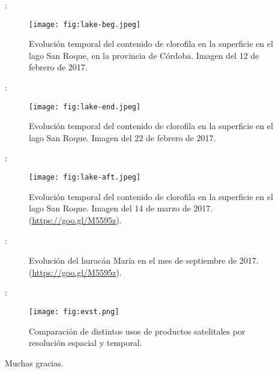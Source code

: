 \begin{frame}{\secname : \subsecname}
    \begin{figure}[h!]
        \centering
        \texttt{[image: fig:lake-beg.jpeg]}
        \caption{Evolución temporal del contenido de clorofila en la superficie en el lago San Roque, en la provincia de Córdoba. Imagen del 12 de febrero de 2017.}
        \label{fig:lake-beg}
    \end{figure}
\end{frame}

\begin{frame}{\secname : \subsecname}
    \begin{figure}[h!]
        \centering
        \texttt{[image: fig:lake-end.jpeg]}
        \caption{Evolución temporal del contenido de clorofila en la superficie en el lago San Roque. Imagen del 22 de febrero de 2017.}
        \label{fig:lake-end}
    \end{figure}
\end{frame}

\begin{frame}{\secname : \subsecname}
    \begin{figure}[h!]
        \centering
        \texttt{[image: fig:lake-aft.jpeg]}
        \caption{Evolución temporal del contenido de clorofila en la superficie en el lago San Roque. Imagen del 14 de marzo de 2017. (\href{https://goo.gl/M5595z}{https://goo.gl/M5595z}).}
        \label{fig:lake-aft}
    \end{figure}
\end{frame}

\begin{frame}{\secname : \subsecname}
    \begin{figure}[h!]
    \centering
    \caption{Evolución del huracán María en el mes de septiembre de 2017. (\href{https://goo.gl/M5595z}{https://goo.gl/M5595z}).}
    \end{figure}
\end{frame}

\begin{frame}{\secname : \subsecname}
    \begin{figure}[h!]
        \centering
        \texttt{[image: fig:evst.png]}
        \caption{Comparación de distintos usos de productos satelitales por resolución espacial y temporal.}
        \label{fig:evst}
    \end{figure}
\end{frame}

\begin{frame}{\secname}
Muchas gracias.
\end{frame}
